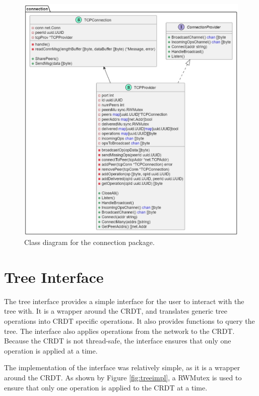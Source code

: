 \documentclass[12pt]{report}
\begin{document}
\begin{figure}[H]
    \centering
    \includegraphics[width=1\textwidth]{images/network_impl.jpg}
    \caption{Class diagram for the connection package.}
    \label{fig:networkimpl}
\end{figure}


\section{Tree Interface}
The tree interface provides a simple interface for the user to interact with the tree with. It is a wrapper around the CRDT, and translates generic tree operations into CRDT specific operations. It also provides functions to query the tree. The interface also applies operations from the network to the CRDT. Because the CRDT is not thread-safe, the interface ensures that only one operation is applied at a time. \par
The implementation of the interface was relatively simple, as it is a wrapper around the CRDT. As shown by Figure \ref{fig:treeimpl}, a RWMutex is used to ensure that only one operation is applied to the CRDT at a time. 
\end{document}
